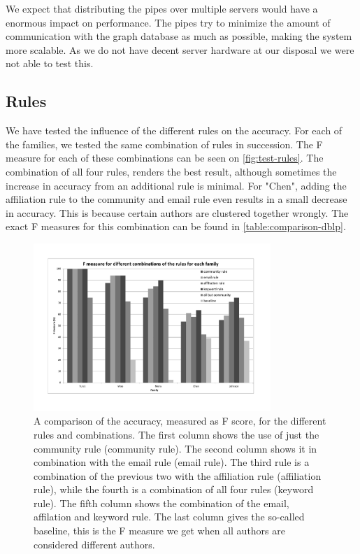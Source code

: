 We expect that distributing the pipes over multiple servers would have a enormous impact on performance. The pipes try to minimize the amount of communication with the graph database as much as possible, making the system more scalable. As we do not have decent server hardware at our disposal we were not able to test this.

\subsection{Rules}

We have tested the influence of the different rules on the accuracy. For each of the families, we tested the same combination of rules in succession. The F measure for each of these combinations can be seen on \autoref{fig:test-rules}. The combination of all four rules, renders the best result, although sometimes the increase in accuracy from an additional rule is minimal. For "Chen", adding the affiliation rule to the community and email rule even results in a small decrease in accuracy. This is because certain authors are clustered together wrongly. The exact F measures for this combination can be found in \autoref{table:comparison-dblp}. 

\begin{figure}[htb]
	\centering
		\includegraphics[width=0.80\textwidth]{./fig/test-rules.pdf}
	\caption{A comparison of the accuracy, measured as F score, for the different rules and combinations. The first column shows the use of just the community rule (community rule). The second column shows it in combination with the email rule (email rule). The third rule is a combination of the previous two with the affiliation rule (affiliation rule), while the fourth is a combination of all four rules (keyword rule). The fifth column shows the combination of the email, affilation and keyword rule. The last column gives the so-called baseline, this is the F measure we get when all authors are considered different authors.}
	\label{fig:test-rules}
\end{figure}

